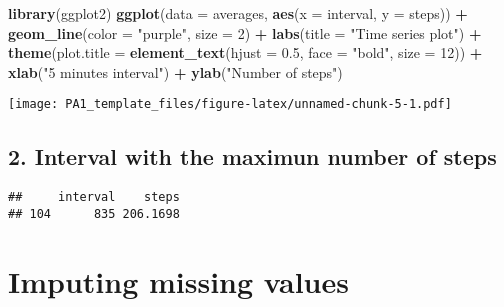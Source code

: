 \documentclass[
]{article}
\newenvironment{Shaded}{\begin{snugshade}}{\end{snugshade}}
\newcommand{\DataTypeTok}[1]{\textcolor[rgb]{0.13,0.29,0.53}{#1}}
\newcommand{\DecValTok}[1]{\textcolor[rgb]{0.00,0.00,0.81}{#1}}
\newcommand{\FloatTok}[1]{\textcolor[rgb]{0.00,0.00,0.81}{#1}}
\newcommand{\KeywordTok}[1]{\textcolor[rgb]{0.13,0.29,0.53}{\textbf{#1}}}
\newcommand{\NormalTok}[1]{#1}
\newcommand{\OperatorTok}[1]{\textcolor[rgb]{0.81,0.36,0.00}{\textbf{#1}}}
\newcommand{\StringTok}[1]{\textcolor[rgb]{0.31,0.60,0.02}{#1}}
\begin{document}
\begin{Shaded}
\begin{Highlighting}[]
\KeywordTok{library}\NormalTok{(ggplot2)}
\KeywordTok{ggplot}\NormalTok{(}\DataTypeTok{data =}\NormalTok{ averages, }\KeywordTok{aes}\NormalTok{(}\DataTypeTok{x =}\NormalTok{ interval, }\DataTypeTok{y =}\NormalTok{ steps)) }\OperatorTok{+}
\StringTok{  }\KeywordTok{geom_line}\NormalTok{(}\DataTypeTok{color =} \StringTok{"purple"}\NormalTok{, }\DataTypeTok{size =} \DecValTok{2}\NormalTok{) }\OperatorTok{+}
\StringTok{  }\KeywordTok{labs}\NormalTok{(}\DataTypeTok{title =} \StringTok{"Time series plot"}\NormalTok{) }\OperatorTok{+}
\StringTok{  }\KeywordTok{theme}\NormalTok{(}\DataTypeTok{plot.title =} \KeywordTok{element_text}\NormalTok{(}\DataTypeTok{hjust =} \FloatTok{0.5}\NormalTok{, }\DataTypeTok{face =} \StringTok{"bold"}\NormalTok{, }\DataTypeTok{size =} \DecValTok{12}\NormalTok{)) }\OperatorTok{+}
\StringTok{  }\KeywordTok{xlab}\NormalTok{(}\StringTok{"5 minutes interval"}\NormalTok{) }\OperatorTok{+}
\StringTok{  }\KeywordTok{ylab}\NormalTok{(}\StringTok{"Number of steps"}\NormalTok{)}
\end{Highlighting}
\end{Shaded}

\texttt{[image: PA1\_template\_files/figure-latex/unnamed-chunk-5-1.pdf]}

\hypertarget{interval-with-the-maximun-number-of-steps}{%
\subsection{2. Interval with the maximun number of
steps}\label{interval-with-the-maximun-number-of-steps}}

\begin{Shaded}
\end{Shaded}

\begin{verbatim}
##     interval    steps
## 104      835 206.1698
\end{verbatim}

\hypertarget{imputing-missing-values}{%
\section{Imputing missing values}\label{imputing-missing-values}}
\end{document}
